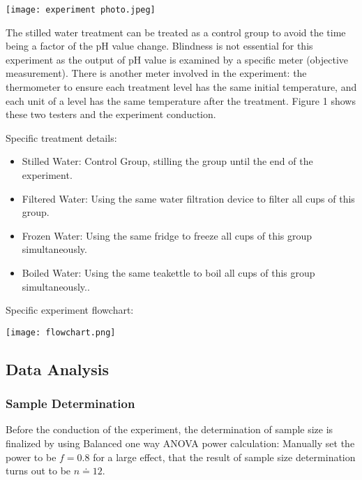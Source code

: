 \documentclass[12pt,]{article}
\let\origfigure\figure
\let\endorigfigure\endfigure
\renewenvironment{figure}[1][2] {
    \expandafter\origfigure\expandafter[H]
} {
    \endorigfigure
}
\begin{document}
\begin{figure}[H]
  \centering
  \texttt{[image: experiment photo.jpeg]}
  \caption{Experiment Conduction with pH Meter and Thermometer}
\end{figure}
\newpage

The stilled water treatment can be treated as a control group to avoid
the time being a factor of the pH value change. Blindness is not
essential for this experiment as the output of pH value is examined by a
specific meter (objective measurement). There is another meter involved
in the experiment: the thermometer to ensure each treatment level has
the same initial temperature, and each unit of a level has the same
temperature after the treatment. Figure 1 shows these two testers and
the experiment conduction.

Specific treatment details:

\begin{itemize}
\item Stilled Water: Control Group, stilling the group until the end of the experiment.
\item Filtered Water: Using the same water filtration device to filter all cups of this group. 
\item Frozen Water: Using the same fridge to freeze all cups of this group simultaneously. 
\item Boiled Water: Using the same teakettle to boil all cups of this group simultaneously.. 
\end{itemize}

Specific experiment flowchart:

\begin{figure}[H]
  \centering
  \texttt{[image: flowchart.png]}
\end{figure}

\hypertarget{data-analysis}{%
\subsection{Data Analysis}\label{data-analysis}}

\hypertarget{sample-determination}{%
\subsubsection{Sample Determination}\label{sample-determination}}

Before the conduction of the experiment, the determination of sample
size is finalized by using Balanced one way ANOVA power calculation:
Manually set the power to be \(f=0.8\) for a large effect, that the
result of sample size determination turns out to be \(n\doteq 12\).
\end{document}
